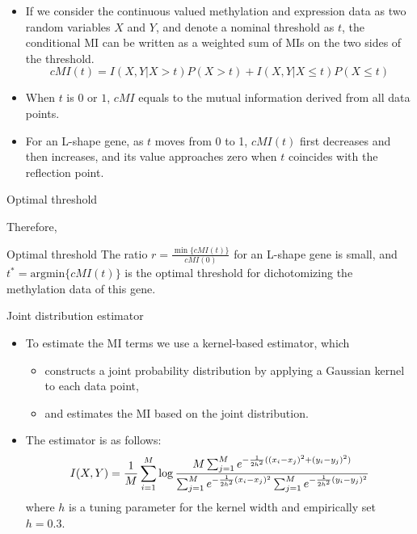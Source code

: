 \documentclass[handout]{beamer}
\begin{document}
\begin{frame}
  \begin{itemize}
  \item If we consider the continuous valued methylation and expression data as two random variables
$X$ and $Y$, and denote a nominal threshold as $t$, the conditional MI can be written as a
weighted sum of MIs on the two sides of the threshold.
\[
\mathit{cMI}(t)=I(X,Y|X>t)P(X>t) + I(X,Y|X\le t)P(X\le t)
\]

\item When $t$ is $0$ or $1$, $\mathit{cMI}$ equals to the mutual information derived 
from all data points.

\item For an L-shape gene, as $t$ moves from 0 to 1, $\mathit{cMI}(t)$ first decreases and then
increases, and its value approaches zero when $t$ coincides with the reflection point. 
  \end{itemize}
\end{frame}

\begin{frame}{Optimal threshold}

Therefore,
\begin{block}{Optimal threshold}
The ratio $r=\frac{\min\{\mathit{cMI}(t)\}}{\mathit{cMI}(0)}$ for an L-shape gene is small, 
and $t^{\ast} = \mathrm{argmin}\{ \mathit{cMI}(t) \}$ is the optimal threshold for 
dichotomizing the methylation data of this gene.
\end{block}

\end{frame}

\begin{frame}{Joint distribution estimator}
  \begin{itemize}
  \item To estimate the MI terms we use a kernel-based estimator, which 
    \begin{itemize}
    \item constructs a joint
probability distribution by applying a Gaussian kernel to each data point,
\item  and estimates
the MI based on the joint distribution. 
    \end{itemize}
\item The estimator is as follows:
\[
I(X,Y) = \frac 1M \sum_{i=1}^M \log\frac{M\sum_{j=1}^M e^{-\frac{1}{2h^2}((x_i-x_j)^2+(y_i-y_j)^2)}}{%
                                      \sum_{j=1}^M e^{-\frac{1}{2h^2}(x_i-x_j)^2} \sum_{j=1}^M e^{-\frac{1}{2h^2}(y_i-y_j)^2}}
\]
where $h$ is a tuning parameter for the kernel width and empirically set $h=0.3$.
  \end{itemize}

\end{frame}
\end{document}
